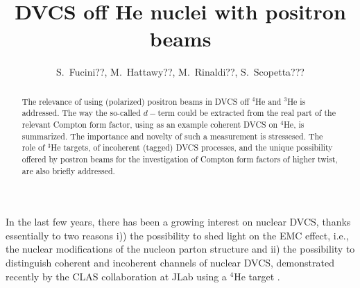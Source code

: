\documentclass[times, twoside]{PosWhiPap}
\begin{document}
\title{DVCS off He nuclei with positron beams}

\author[]
{S.~Fucini??, M.~Hattawy??, M.~Rinaldi??, S.~Scopetta???  }


\maketitle

\begin{abstract}
The relevance of using (polarized) positron beams in DVCS
off $^4$He and $^3$He is addressed.
The way the so-called $d-$term could be extracted from the real
part of the relevant Compton form factor, using as an example
coherent DVCS on $^4$He, is summarized.
The importance and novelty of such a measurement is stressesed.
The role of $^3$He targets, of incoherent (tagged) DVCS processes,
and the unique possibility offered by postron beams for the investigation of  Compton form factors of higher twist, are also  briefly addressed.
\end {abstract}




In the last few years, there has been a
growing interest on nuclear DVCS, thanks essentially to
two reasons
i)) the possibility to shed light on the EMC
effect, i.e., the nuclear modifications of the nucleon parton structure
\cite{Dupre:2015jha,Cloet:2019mql}
and ii) the possibility to distinguish
coherent and incoherent channels
of nuclear DVCS, demonstrated recently by the CLAS collaboration at JLab using a $^4$He target \cite{Hattawy:2017woc,Hattawy:2018liu}.
\end{document}
